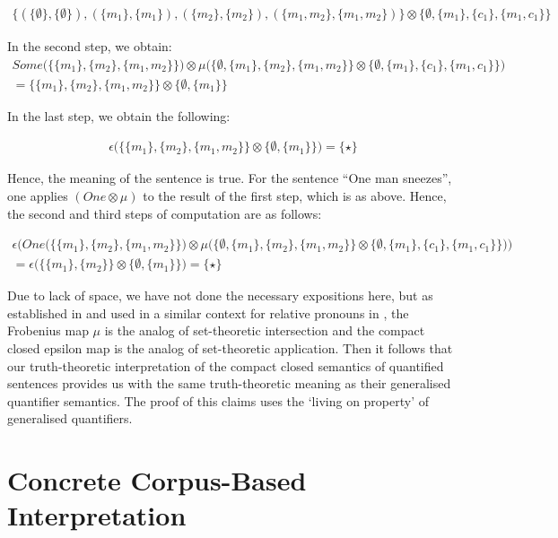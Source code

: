 \documentclass[a4paper,11pt]{easychair}
\begin{document}
\begin{align*}
  \{(\{\emptyset\}, \{\emptyset\}), (\{m_1\}, \{m_1\}), (\{m_2\}, \{m_2\}), (\{m_1, m_2\}, \{m_1, m_2\}) \} \otimes  \{\emptyset, \{m_1\}, \{c_1\}, \{m_1, c_1\}\} 
\end{align*}

\noindent
In the second step, we obtain:
\begin{align*}
Some\Big ( \{\{m_1\}, \{m_2\}, \{m_1, m_2\}\} \Big) \otimes \mu \Big( \{\emptyset, \{m_1\}, \{m_2\}, \{m_1, m_2\}\}  \otimes \{\emptyset, \{m_1\}, \{c_1\}, \{m_1, c_1\}\} \Big)\\
= \{\{m_1\}, \{m_2\}, \{m_1, m_2\}\}  \otimes \{\emptyset, \{m_1\}\}
\end{align*}

\noindent
In the last step, we obtain the following:

\begin{align*}
\epsilon\Big(\{\{m_1\}, \{m_2\}, \{m_1, m_2\}\}  \otimes \{\emptyset, \{m_1\}\}\Big) = \{\star\}
\end{align*}

\noindent
Hence, the meaning of the sentence is true.  For the sentence ``One man sneezes'',  one applies $(One \otimes \mu)$ to the result of the first step, which is as above. Hence,  the second and third steps of computation are as follows:

{\small
\begin{align*}
\epsilon   \Big( One\Big ( \{\{m_1\}, \{m_2\}, \{m_1, m_2\}\} \Big) \otimes \mu \Big( \{\emptyset, \{m_1\}, \{m_2\}, \{m_1, m_2\}\}  \otimes \{\emptyset, \{m_1\}, \{c_1\}, \{m_1, c_1\}\} \Big)  \Big)\\
= \epsilon \Big(\{\{m_1\}, \{m_2\}\}  \otimes \{\emptyset, \{m_1\}\}\Big) = \{\star\}
\end{align*}
}


Due to lack of space, we  have not done the necessary expositions here, but as established  in \cite{CoeckePaq} and used in a similar context for relative pronouns  in \cite{SadrClarkCoecke1, SadrClarkCoecke2},  the Frobenius map $\mu$ is the analog of set-theoretic intersection and the compact closed epsilon map is the analog of set-theoretic
application. Then it follows  that  our truth-theoretic interpretation of the
compact closed semantics of quantified sentences provides us with the same truth-theoretic meaning as their generalised
quantifier semantics. The proof of this claims uses  the  `living on property' of generalised quantifiers. 

\section{Concrete Corpus-Based Interpretation}
\end{document}
